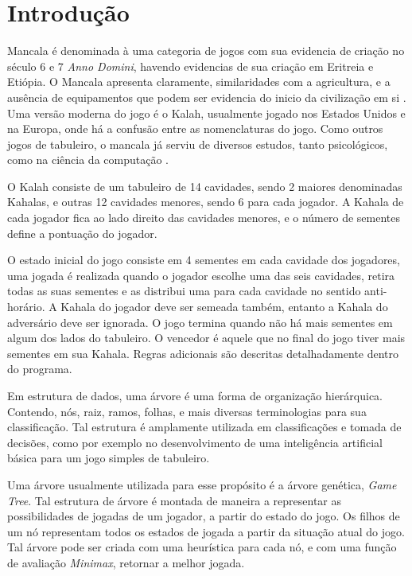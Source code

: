 \documentclass[a4paper, 12pt]{article}
\begin{document}
	\section{Introdução}
		Mancala é denominada à uma categoria de jogos com sua evidencia de criação no século 6 e 7 \emph{Anno Domini}, havendo evidencias de sua criação em Eritreia e Etiópia. O Mancala apresenta claramente, similaridades com a agricultura, e a ausência de equipamentos que podem ser evidencia do inicio da civilização em si \cite{mancala}. Uma versão moderna do jogo é o Kalah, usualmente jogado nos Estados Unidos e na Europa, onde há a confusão entre as nomenclaturas do jogo. Como outros jogos de tabuleiro, o mancala já serviu de diversos estudos, tanto psicológicos, como na ciência da computação \cite{gobet}.

		O Kalah consiste de um tabuleiro de 14 cavidades, sendo 2 maiores denominadas Kahalas, e outras 12 cavidades menores, sendo 6 para cada jogador. A Kahala de cada jogador fica ao lado direito das cavidades menores, e o número de sementes define a pontuação do jogador.

		O estado inicial do jogo consiste em 4 sementes em cada cavidade dos jogadores, uma jogada é realizada quando o jogador escolhe uma das seis cavidades, retira todas as suas sementes e as distribui uma para cada cavidade no sentido anti-horário. A Kahala do jogador deve ser semeada também, entanto a Kahala do adversário deve ser ignorada. O jogo termina quando não há mais sementes em algum dos lados do tabuleiro. O vencedor é aquele que no final do jogo tiver mais sementes em sua Kahala. Regras adicionais são descritas detalhadamente dentro do programa.

		Em estrutura de dados, uma árvore é uma forma de organização hierárquica. Contendo, nós, raiz, ramos, folhas, e mais diversas terminologias para sua classificação. Tal estrutura é amplamente utilizada em classificações e tomada de decisões, como por exemplo no desenvolvimento de uma inteligência artificial básica para um jogo simples de tabuleiro.

		Uma árvore usualmente utilizada para esse propósito é a árvore genética, \emph{Game Tree}. Tal estrutura de árvore é montada de maneira a representar as possibilidades de jogadas de um jogador, a partir do estado do jogo. Os filhos de um nó representam todos os estados de jogada a partir da situação atual do jogo. Tal árvore pode ser criada com uma heurística para cada nó, e com uma função de avaliação \emph{Minimax}, retornar a melhor jogada.
\end{document}
